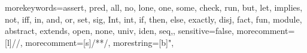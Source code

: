  {
	morekeywords={assert, pred, all, no, lone, one, some, check, run, but, let, implies, not, iff, in, and, or, set, sig, Int, int, if, then, else, exactly, disj, fact, fun, module, abstract, extends, open, none, univ, iden, seq,},
	sensitive=false,
	morecomment=[l]{//},
	morecomment=[s]{/*}{*/},
	morestring=[b]", }


